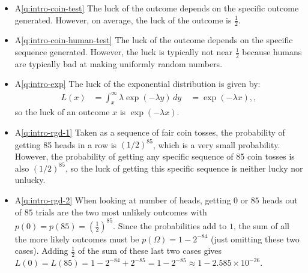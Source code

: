 \begin{itemize}
\begin{align*}
&L((1,1,1))=\frac{27}{128} \approx 0.2109 \,,\\
&L((0,1,1))=L((1,0,1))=L((1,1,0))=\frac{81}{128} \approx 0.6328 \,,\\
&L((1,0,0))=L((0,1,0))=L((0,0,1))=\frac{117}{128} \approx 0.9141 \,,\\
&L((0,0,0))=\frac{127}{128} \approx 0.9922 \,.
\end{align*}

\item A\ref{q:intro-coin-test} The luck of the outcome depends on the specific outcome generated. However, on average, the luck of the outcome is $\frac{1}{2}$.

\item A\ref{q:intro-coin-human-test} The luck of the outcome depends on the specific sequence generated. However, the luck is typically not near $\frac{1}{2}$ because humans are typically bad at making uniformly random numbers.

\item A\ref{q:intro-exp} The luck of the exponential distribution is given by:
\begin{align*}
L(x) &= \int_x^\infty \lambda \exp(-\lambda y) \, dy \
&= \exp(-\lambda x) ,,
\end{align*}
so the luck of an outcome $x$ is $\exp(-\lambda x)$.

\item A\ref{q:intro-rgd-1} Taken as a sequence of fair coin tosses, the probability of getting 85 heads in a row is $(1/2)^{85}$, which is a very small probability. However, the probability of getting any specific sequence of 85 coin tosses is also $(1/2)^{85}$, so the luck of getting this specific sequence is neither lucky nor unlucky.

\item A\ref{q:intro-rgd-2} When looking at number of heads, getting $0$ or $85$ heads out of $85$ trials are the two most unlikely outcomes with $p(0)=p(85)=(\frac{1}{2})^{85}$. Since the probabilities add to $1$, the sum of all the more likely outcomes must be $p(\Omega)=1-2^{-84}$ (just omitting these two cases).  Adding $\frac{1}{2}$ of the sum of these last two cases gives $L(0)=L(85)=1-2^{-84}+2^{-85}=1-2^{-85}\approx 1-2.585\times 10^{-26}$.

\end{itemize}

